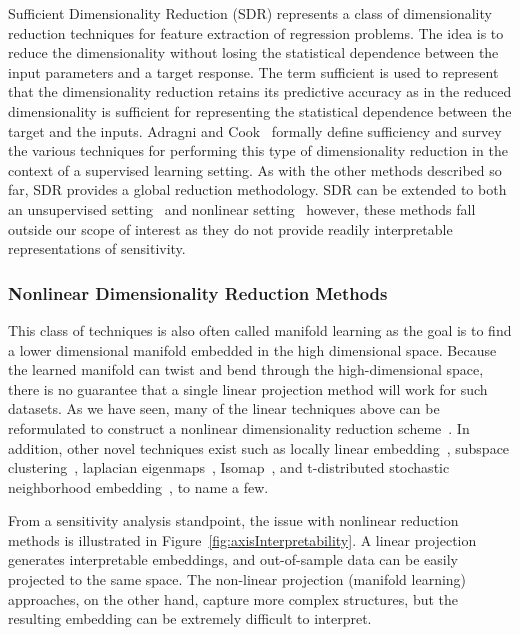 Sufficient Dimensionality Reduction (SDR) represents a class of dimensionality reduction techniques for feature extraction of regression problems.
%
The idea is to reduce the dimensionality without losing the statistical dependence between the input parameters and a target response.
%
The term sufficient is used to represent that the dimensionality reduction retains its predictive accuracy as in the reduced dimensionality is sufficient for representing the statistical dependence between the target and the inputs.
%
Adragni and Cook~\cite{AdragniCook2009} formally define sufficiency and survey the various techniques for performing this type of dimensionality reduction in the context of a supervised learning setting.
%
As with the other methods described so far, SDR provides a global reduction methodology.
%
SDR can be extended to both an unsupervised setting~\cite{WangShaJordan2010} and nonlinear setting~\cite{FukumizuBachJordan2004,FukumizuBachJordan2009,NilssonShaJordan2007} however, these methods fall outside our scope of interest as they do not provide readily interpretable representations of sensitivity.

\subsubsection{Nonlinear Dimensionality Reduction Methods}
\label{sec:nonlinearDR}

This class of techniques is also often called manifold learning as the goal is to find a lower dimensional manifold embedded in the high dimensional space.
%
Because the learned manifold can twist and bend through the high-dimensional space, there is no guarantee that a single linear projection method will work for such datasets.
%
As we have seen, many of the linear techniques above can be reformulated to construct a nonlinear dimensionality reduction scheme~\cite{ScholkopfSmolaMuller1997,CollinsDasguptaSchapire2001,MohamedGhahramaniHeller2009,HyvarinenKarhunenOja2001,MikaRatschWeston1999,McLachlan2004,FukumizuBachJordan2004,FukumizuBachJordan2009,NilssonShaJordan2007}.
%
In addition, other novel techniques exist such as locally linear embedding~\cite{RoweisSaul2000}, subspace clustering~\cite{}, laplacian eigenmaps~\cite{BelkinNiyogi2003}, Isomap~\cite{TenenbaumSilvaLangford2000}, and t-distributed stochastic neighborhood embedding~\cite{MaatenHinton2008}, to name a few.

From a sensitivity analysis standpoint, the issue with nonlinear reduction methods is illustrated in Figure~\ref{fig:axisInterpretability}.
%
A linear projection generates interpretable embeddings, and out-of-sample data can be easily projected to the same space.
%
The non-linear projection (manifold learning) approaches, on the other hand, capture more complex structures, but the resulting embedding can be extremely difficult to interpret.
%

